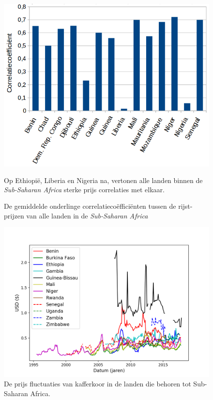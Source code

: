 \documentclass{article}
\begin{document}
 \begin{figure}[h!]
        \centering
        \includegraphics[scale=0.4]{rice_corr.png}
        \caption{De gemiddelde onderlinge correlatiecoëfficiënten tussen de rijst-prijzen van alle landen in de \textit{Sub-Saharan Africa} }
        \label{rice-corr}
        \medskip
        \small
        Op Ethiopië, Liberia en Nigeria na, vertonen alle landen binnen de \textit{Sub-Saharan Africa} sterke prijs correlaties met elkaar. 
        \end{figure}
        
 \begin{figure}[h!]
        \centering
        \includegraphics[scale=0.5]{sorghum.png}
        \caption{De prijs fluctuaties van kafferkoor in de landen die behoren tot Sub-Saharan Africa.}
        \label{sorghum-regio}
        \medskip
        \small
        \end{figure}
\end{document}
